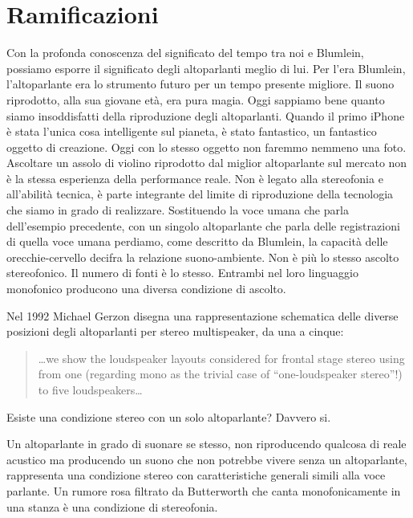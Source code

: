 \section{Ramificazioni}

Con la profonda conoscenza del significato del tempo tra noi e Blumlein,
possiamo esporre il significato degli altoparlanti meglio di lui. Per l'era
Blumlein, l'altoparlante era lo strumento futuro per un tempo presente migliore.
Il suono riprodotto, alla sua giovane età, era pura magia. Oggi sappiamo bene
quanto siamo insoddisfatti della riproduzione degli altoparlanti. Quando il
primo iPhone è stata l'unica cosa intelligente sul pianeta, è stato fantastico,
un fantastico oggetto di creazione. Oggi con lo stesso oggetto non faremmo
nemmeno una foto. Ascoltare un assolo di violino riprodotto dal miglior
altoparlante sul mercato non è la stessa esperienza della performance reale.
Non è legato alla stereofonia e all'abilità tecnica, è parte integrante del
limite di riproduzione della tecnologia che siamo in grado di realizzare.
%
Sostituendo la voce umana che parla dell'esempio precedente, con un singolo
altoparlante che parla delle registrazioni di quella voce umana perdiamo, come
descritto da Blumlein, la capacità delle orecchie-cervello decifra la relazione
suono-ambiente. Non è più lo stesso ascolto stereofonico. Il numero di fonti è
lo stesso. Entrambi nel loro linguaggio monofonico producono una diversa
condizione di ascolto.%

Nel 1992 Michael Gerzon \cite{mg92pdmsss} disegna una rappresentazione
schematica delle diverse posizioni degli altoparlanti per stereo multispeaker,
da una a cinque:

\begin{quotation}
\ldots we show the loudspeaker layouts considered for frontal stage stereo
using from one (regarding mono as the trivial case of “one-loudspeaker stereo”!)
to five loudspeakers…
\end{quotation}

Esiste una condizione stereo con un solo altoparlante? Davvero si.

Un altoparlante in grado di suonare se stesso, non riproducendo qualcosa di
reale acustico ma producendo un suono che non potrebbe vivere senza un
altoparlante, rappresenta una condizione stereo con caratteristiche generali
simili alla voce parlante. Un rumore rosa filtrato da Butterworth che canta
monofonicamente in una stanza è una condizione di stereofonia.

